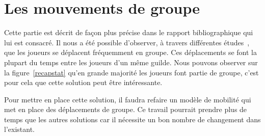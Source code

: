 \documentclass[11pt,a4paper]{article}
\begin{document}
\newpage
\section{Les mouvements de groupe}
Cette partie est décrit de façon plus précise dans le rapport bibliographique qui lui est consacré. Il nous a été possible d'observer, à travers différentes études~\cite{1124834,1124834,1031667}, que les joueurs se déplacent fréquemment en groupe. Ces déplacements se font la plupart du temps entre les joueurs d'un même guilde. Nous pouvons observer sur la figure~\ref{recapstat} qu'en grande majorité les joueurs font partie de groupe, c'est pour cela que cette solution peut être intéressante. 
\par Pour mettre en place cette solution, il faudra refaire un modèle de mobilité qui met en place des déplacements de groupe. Ce travail pourrait prendre plus de temps que les autres solutions car il nécessite un bon nombre de changement dans l'existant.
\end{document}
